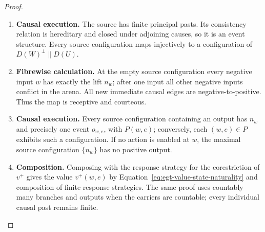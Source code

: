 \documentclass[11pt,a4paper]{article}
\numberwithin{equation}{section}
\theoremstyle{definition}
\theoremstyle{remark}
\theoremstyle{plain}
\begin{document}
\begin{proof}
\leavevmode
\begin{enumerate}[label=\textup{(\arabic*)},leftmargin=*,itemsep=4pt,topsep=3pt]
  \item \textbf{Causal execution.} The source has finite principal pasts. Its consistency relation is
hereditary and closed under adjoining causes, so it is an event
structure. Every source configuration maps injectively to a
configuration of $D(W)^\perp\parallel D(U)$.
  \item \textbf{Fibrewise calculation.} At the empty source
configuration every negative input $w$ has exactly the lift $n_w$;
after one input all other negative inputs conflict in the arena. All new immediate causal edges are negative-to-positive. Thus the
map is receptive and courteous.
  \item \textbf{Causal execution.} Every source configuration containing
an output has $n_w$ and precisely one event $o_{w,e}$, with $P(w,e)$;
conversely, each
$(w,e)\in P$ exhibits such a configuration. If no action is enabled at
$w$, the maximal source configuration $\{n_w\}$ has no positive
output.
  \item \textbf{Composition.} Composing with the response strategy for the
corestriction of $v^+$ gives the value $v^+(w,e)$ by
Equation~\eqref{eq:egt-value-state-naturality} and composition of
finite response strategies. The same proof uses countably many
branches and outputs when the carriers are countable; every
individual causal past remains finite.
\end{enumerate}
\end{proof}
\end{document}
